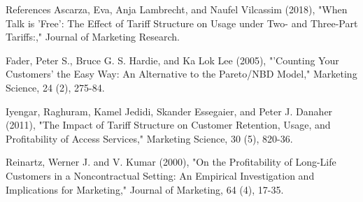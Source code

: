 \documentclass[titlepage,12pt,letterpaper]{article}
\numberwithin{equation}{section}
\begin{document}
References
Ascarza, Eva, Anja Lambrecht, and Naufel Vilcassim (2018), "When Talk is 'Free': The Effect of Tariff Structure on Usage under Two- and Three-Part Tariffs:," Journal of Marketing Research.

Fader, Peter S., Bruce G. S. Hardie, and Ka Lok Lee (2005), "'Counting Your Customers' the Easy Way: An Alternative to the Pareto/NBD Model," Marketing Science, 24 (2), 275-84.

Iyengar, Raghuram, Kamel Jedidi, Skander Essegaier, and Peter J. Danaher (2011), "The Impact of Tariff Structure on Customer Retention, Usage, and Profitability of Access Services," Marketing Science, 30 (5), 820-36.

Reinartz, Werner J. and V. Kumar (2000), "On the Profitability of Long-Life Customers in a Noncontractual Setting: An Empirical Investigation and Implications for Marketing," Journal of Marketing, 64 (4), 17-35.
\end{document}
